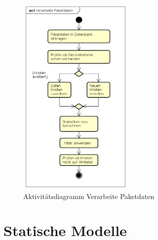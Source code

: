     \begin{figure}[h!]
        \centering
        \includegraphics[width=0.5\textwidth]{../diagrams/AD_Verarbeite_Paketdaten}
        \caption[Aktivitätsdiagramm Verarbeite Paketdaten]{Aktivitätsdiagramm Verarbeite Paketdaten}
    \end{figure}

\section{Statische Modelle}

